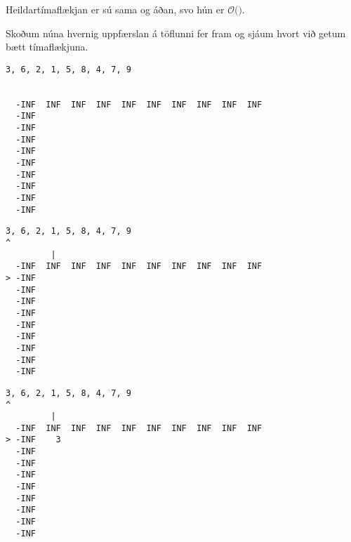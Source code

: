 {
}

{
    {
        \item<1-> Heildartímaflækjan er sú sama og áðan, svo hún er $\mathcal{O}($$)$.
        \item<3-> Skoðum núna hvernig uppfærslan á töflunni fer fram og sjáum hvort við getum bætt tímaflækjuna.
    }
}

{ \begin{verbatim}
3, 6, 2, 1, 5, 8, 4, 7, 9


  -INF  INF  INF  INF  INF  INF  INF  INF  INF  INF
  -INF                                             
  -INF                                             
  -INF                                             
  -INF                                             
  -INF                                             
  -INF                                             
  -INF                                             
  -INF                                             
  -INF                                             
\end{verbatim} }

{ \begin{verbatim}
3, 6, 2, 1, 5, 8, 4, 7, 9
^
         |
  -INF  INF  INF  INF  INF  INF  INF  INF  INF  INF
> -INF                                             
  -INF                                             
  -INF                                             
  -INF                                             
  -INF                                             
  -INF                                             
  -INF                                             
  -INF                                             
  -INF                                             
\end{verbatim} }

{ \begin{verbatim}
3, 6, 2, 1, 5, 8, 4, 7, 9
^
         |
  -INF  INF  INF  INF  INF  INF  INF  INF  INF  INF
> -INF    3                                        
  -INF                                             
  -INF                                             
  -INF                                             
  -INF                                             
  -INF                                             
  -INF                                             
  -INF                                             
  -INF                                             
\end{verbatim} }

